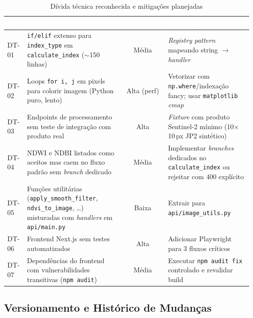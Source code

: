 \documentclass[11pt, a4paper]{article}
\begin{document}
\renewcommand{\arraystretch}{1.4}
\begin{table}[H]
\centering
\small
{}
\begin{tabularx}{\textwidth}{@{}llcX@{}}
\toprule
\rowcolor{tabheader}\textcolor{white}{\textbf{ID}} & \textcolor{white}{\textbf{Item}} & \textcolor{white}{\textbf{Severidade}} & \textcolor{white}{\textbf{Mitigação proposta}}\\
\midrule
DT-01 & \texttt{if/elif} extenso para \texttt{index\_type} em \texttt{calculate\_index} (\(\sim\)150 linhas) & Média & \textit{Registry pattern} mapeando string $\rightarrow$ \textit{handler}\\
DT-02 & Loops \texttt{for i, j} em pixels para colorir imagem (Python puro, lento) & Alta (perf) & Vetorizar com \texttt{np.where}/indexação fancy; usar \texttt{matplotlib} \textit{cmap}\\
DT-03 & Endpoints de processamento sem teste de integração com produto real & Alta & \textit{Fixture} com produto Sentinel-2 mínimo (10$\times$10\,px JP2 sintético)\\
DT-04 & NDWI e NDBI listados como aceitos mas caem no fluxo padrão sem \textit{branch} dedicado & Média & Implementar \textit{branches} dedicados no \texttt{calculate\_index} ou rejeitar com 400 explícito\\
DT-05 & Funções utilitárias (\texttt{apply\_smooth\_filter}, \texttt{ndvi\_to\_image}, \dots) misturadas com \textit{handlers} em \texttt{api/main.py} & Baixa & Extrair para \texttt{api/image\_utils.py}\\
DT-06 & Frontend Next.js sem testes automatizados & Alta & Adicionar Playwright para 3 fluxos críticos\\
DT-07 & Dependências do frontend com vulnerabilidades transitivas (\texttt{npm audit}) & Média & Executar \texttt{npm audit fix} controlado e revalidar build\\
\bottomrule
\end{tabularx}
\caption{Dívida técnica reconhecida e mitigações planejadas}
\end{table}

\subsection{Versionamento e Histórico de Mudanças}
\end{document}
